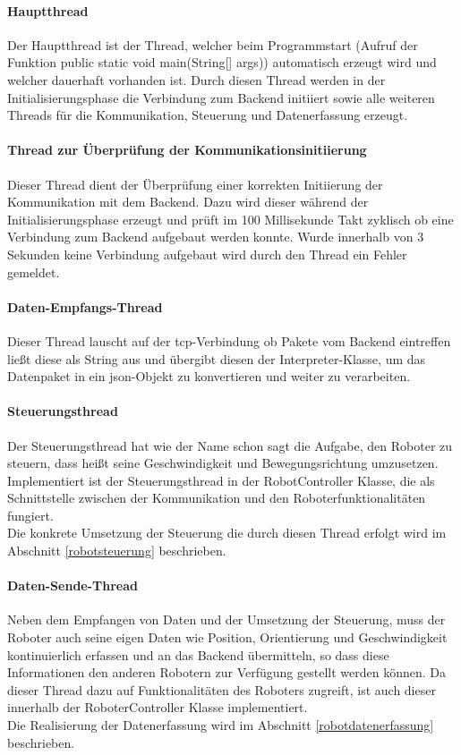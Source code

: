 \paragraph{Hauptthread}
Der Hauptthread ist der Thread, welcher beim Programmstart (Aufruf der Funktion public static void main(String[] args)) automatisch 
erzeugt wird und welcher dauerhaft vorhanden ist. Durch diesen Thread werden in der Initialisierungsphase die Verbindung zum Backend initiiert 
sowie alle weiteren Threads für die Kommunikation, Steuerung und Datenerfassung erzeugt. 
\paragraph{Thread zur Überprüfung der Kommunikationsinitiierung}
Dieser Thread dient der Überprüfung einer korrekten Initiierung der Kommunikation mit dem Backend. Dazu wird dieser während der 
Initialisierungsphase erzeugt und prüft im 100 Millisekunde Takt zyklisch ob eine Verbindung zum Backend aufgebaut werden konnte. Wurde
innerhalb von 3 Sekunden keine Verbindung aufgebaut wird durch den Thread ein Fehler gemeldet.
\paragraph{Daten-Empfangs-Thread}
Dieser Thread lauscht auf der \gls{tcp}-Verbindung ob Pakete vom Backend eintreffen ließt diese als String aus und übergibt diesen der 
Interpreter-Klasse, um das Datenpaket in ein \gls{json}-Objekt zu konvertieren und weiter zu verarbeiten.
\paragraph{Steuerungsthread}
Der Steuerungsthread hat wie der Name schon sagt die Aufgabe, den Roboter zu steuern, dass heißt seine Geschwindigkeit und Bewegungsrichtung 
umzusetzen. Implementiert ist der Steuerungsthread in der RobotController Klasse, die als Schnittstelle zwischen der Kommunikation und den
Roboterfunktionalitäten fungiert. \\
Die konkrete Umsetzung der Steuerung die durch diesen Thread erfolgt wird im Abschnitt \eqref{robotsteuerung} beschrieben.
\paragraph{Daten-Sende-Thread}
Neben dem Empfangen von Daten und der Umsetzung der Steuerung, muss der Roboter auch seine eigen Daten wie Position, Orientierung und 
Geschwindigkeit kontinuierlich erfassen und an das Backend übermitteln, so dass diese Informationen den anderen Robotern zur Verfügung
gestellt werden können. Da dieser Thread dazu auf Funktionalitäten des Roboters zugreift, ist auch dieser innerhalb der RoboterController
Klasse implementiert.
\\
Die Realisierung der Datenerfassung wird im Abschnitt \eqref{robotdatenerfassung} beschrieben.
\medskip
\newline
